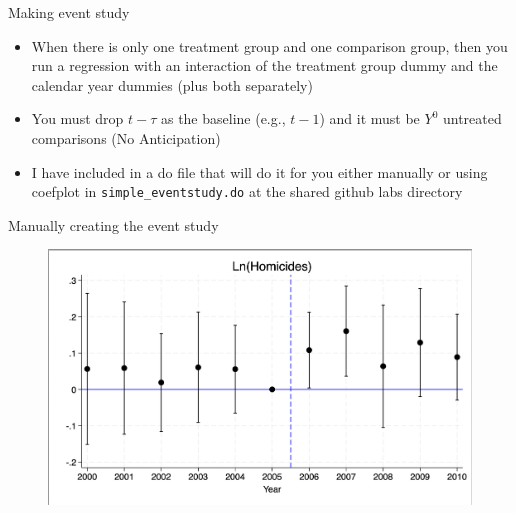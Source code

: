 \documentclass{beamer}
\begin{document}
\begin{frame}{Making event study}

\begin{itemize}
\item When there is only one treatment group and one comparison group, then you run a regression with an interaction of the treatment group dummy and the calendar year dummies (plus both separately)
\item You must drop $t-\tau$ as the baseline (e.g., $t-1$) and it must be $Y^0$ untreated comparisons (No Anticipation)
\item I have included in a do file that will do it for you either manually or using coefplot in \texttt{simple\_eventstudy.do} at the shared github labs directory
\end{itemize}

\end{frame}


\begin{frame}{Manually creating the event study}

	\begin{figure}
	\includegraphics[scale=0.20]{./lecture_includes/simple_eventstudy_manual}
	\end{figure}

\end{frame}
\end{document}
